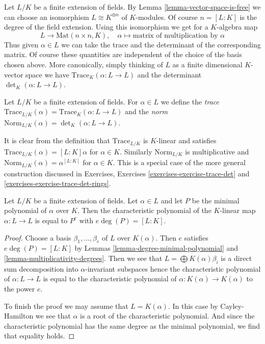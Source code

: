 \noindent
Let $L/K$ be a finite extension of fields. By
Lemma \ref{lemma-vector-space-is-free}
we can choose an isomorphism $L \cong K^{\oplus n}$ of $K$-modules.
Of course $n = [L : K]$ is the degree of the field extension.
Using this isomorphism we get for a $K$-algebra map
$$
L \longrightarrow \text{Mat}(n \times n, K),\quad
\alpha \longmapsto \text{matrix of multiplication by }\alpha
$$
Thus given $\alpha \in L$ we can take the trace and the determinant
of the corresponding matrix. Of course these quantities are independent
of the choice of the basis chosen above. More canonically, simply thinking
of $L$ as a finite dimensional $K$-vector space we have
$\text{Trace}_K(\alpha : L \to L)$ and the determinant
$\det_K(\alpha : L \to L)$.

\begin{definition}
\label{definition-trace-norm}
Let $L/K$ be a finite extension of fields. For $\alpha \in L$ we define
the {\it trace}
$\text{Trace}_{L/K}(\alpha) = \text{Trace}_K(\alpha : L \to L)$
and the {\it norm}
$\text{Norm}_{L/K}(\alpha) = \det_K(\alpha : L \to L)$.
\end{definition}

\noindent
It is clear from the definition that
$\text{Trace}_{L/K}$ is $K$-linear and satisfies
$\text{Trace}_{L/K}(\alpha) = [L : K]\alpha$ for $\alpha \in K$.
Similarly $\text{Norm}_{L/K}$ is multiplicative and
$\text{Norm}_{L/K}(\alpha) = \alpha^{[L : K]}$ for $\alpha \in K$.
This is a special case of the more general construction discussed
in Exercises, Exercises \ref{exercises-exercise-trace-det} and
\ref{exercises-exercise-trace-det-rings}.

\begin{lemma}
\label{lemma-characteristic-vs-minimal-polynomial}
Let $L/K$ be a finite extension of fields. Let $\alpha \in L$ and let $P$
be the minimal polynomial of $\alpha$ over $K$. Then the characteristic
polynomial of the $K$-linear map $\alpha : L \to L$ is equal to
$P^e$ with $e \deg(P) = [L : K]$.
\end{lemma}

\begin{proof}
Choose a basis $\beta_1, \ldots, \beta_e$ of $L$ over $K(\alpha)$.
Then $e$ satisfies $e \deg(P) = [L : K]$ by
Lemmas \ref{lemma-degree-minimal-polynomial} and
\ref{lemma-multiplicativity-degrees}.
Then we see that $L = \bigoplus K(\alpha) \beta_i$ is a
direct sum decomposition into $\alpha$-invariant subspaces
hence the characteristic polynomial of $\alpha : L \to L$
is equal to the characteristic polynomial of
$\alpha : K(\alpha) \to K(\alpha)$ to the power $e$.

\medskip\noindent
To finish the proof we may assume that $L = K(\alpha)$.
In this case by Cayley-Hamilton we see that $\alpha$
is a root of the characteristic polynomial. And since the
characteristic polynomial has the same degree as the minimal
polynomial, we find that equality holds.
\end{proof}

